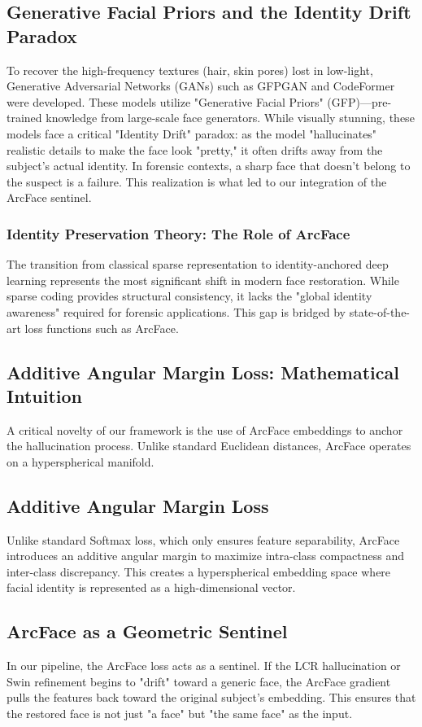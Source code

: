 \subsection{Generative Facial Priors and the Identity Drift Paradox}
To recover the high-frequency textures (hair, skin pores) lost in low-light, Generative Adversarial Networks (GANs) such as GFPGAN \cite{wang2021towards} and CodeFormer \cite{zhou2022codeformer} were developed. These models utilize "Generative Facial Priors" (GFP)—pre-trained knowledge from large-scale face generators. While visually stunning, these models face a critical "Identity Drift" paradox: as the model "hallucinates" realistic details to make the face look "pretty," it often drifts away from the subject's actual identity. In forensic contexts, a sharp face that doesn't belong to the suspect is a failure. This realization is what led to our integration of the ArcFace sentinel.

\subsubsection{Identity Preservation Theory: The Role of ArcFace}
The transition from classical sparse representation to identity-anchored deep learning represents the most significant shift in modern face restoration. While sparse coding provides structural consistency, it lacks the "global identity awareness" required for forensic applications. This gap is bridged by state-of-the-art loss functions such as ArcFace.

\subsection{Additive Angular Margin Loss: Mathematical Intuition}
A critical novelty of our framework is the use of ArcFace embeddings to anchor the hallucination process. Unlike standard Euclidean distances, ArcFace operates on a hyperspherical manifold.

\subsection{Additive Angular Margin Loss}
Unlike standard Softmax loss, which only ensures feature separability, ArcFace introduces an additive angular margin to maximize intra-class compactness and inter-class discrepancy. This creates a hyperspherical embedding space where facial identity is represented as a high-dimensional vector.

\subsection{ArcFace as a Geometric Sentinel}
In our pipeline, the ArcFace loss acts as a sentinel. If the LCR hallucination or Swin refinement begins to "drift" toward a generic face, the ArcFace gradient pulls the features back toward the original subject's embedding. This ensures that the restored face is not just "a face" but "the same face" as the input.

